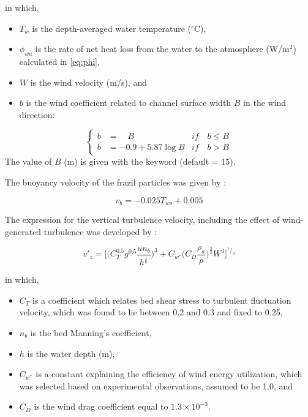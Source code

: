 in which,
\begin{itemize}
    \item $T_w$ is the depth-averaged water temperature ($^{\circ}$C),
    \item $\phi_{wa}$ is the rate of net heat loss from the water to the atmosphere (W/m$^{2}$) calculated in \eqref{eq:phi},
    \item $W$ is the wind velocity (m/s), and
    \item $b$ is the wind coefficient related to channel surface width $B$ in the wind direction:
\end{itemize}
\begin{equation} \label{eq:wind_util_coeff}
  \left\{
  \begin{aligned}
  b &= \quad B\quad & if \quad b \leq B \\
  b &= -0.9+5.87 \log B & if \quad b > B
  \end{aligned}
\right.
\end{equation}
The value of $B$ (m) is given with the keyword  (default = 15).\newline

The buoyancy velocity of the frazil particles was given by \cite{matousek1984types}:

\begin{equation} \label{eq:buoy_vel}
v_b = -0.025 T_{ws} + 0.005
\end{equation}

The expression for the vertical turbulence velocity, including the effect of wind-generated turbulence was developed by \cite{lal1989mathematical}:

\begin{equation} \label{eq:vert_turb_vel}
v'_z = \Bigg[ \bigg( C_T^{0.5} g^{0.5} \frac{un_b}{h^\frac{1}{6}} \bigg) ^{3}+C_{w^*} \bigg(  C_D\frac{\rho_a}{\rho} \bigg) ^\frac{3}{2}W^3 \Bigg]^{^1/_3}
\end{equation}

in which,
\begin{itemize}
    \item $C_T$ is a coefficient which relates bed shear stress to turbulent fluctuation velocity, which was found to lie between 0.2 and 0.3 \cite{rodi1980turbulence} and fixed to 0.25,
    \item $n_b$ is the bed Manning's coefficient,
    \item $h$ is the water depth (m),
    \item $C_{w^*}$ is a constant explaining the efficiency of wind energy utilization, which was selected based on experimental observations, assumed to be 1.0, and
    \item $C_D$ is the wind drag coefficient equal to $1.3 \times 10^{-3}$.
\end{itemize}

